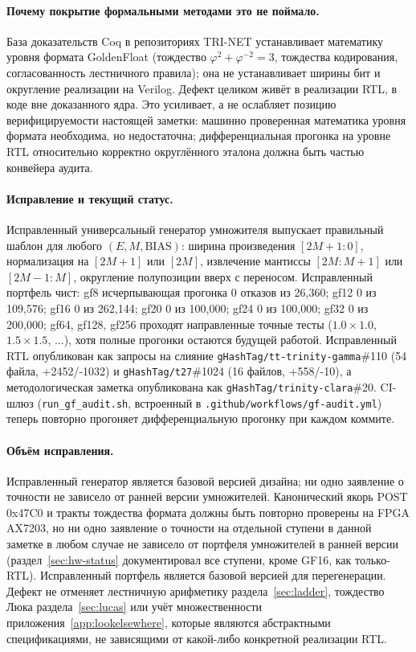 \documentclass[11pt,a4paper]{article}
\theoremstyle{plain}
\begin{document}
\paragraph{Почему покрытие формальными методами это не поймало.}
База доказательств Coq в репозиториях TRI-NET устанавливает математику
уровня формата GoldenFloat (тождество
\(\varphi^{2}+\varphi^{-2}=3\), тождества кодирования, согласованность
лестничного правила); она не устанавливает ширины бит и округление реализации на
Verilog. Дефект целиком живёт в реализации RTL, в коде вне доказанного ядра. Это
усиливает, а не ослабляет позицию верифицируемости настоящей заметки: машинно
проверенная математика уровня формата необходима, но недостаточна; дифференциальная
прогонка на уровне RTL относительно корректно округлённого эталона должна быть
частью конвейера аудита.

\paragraph{Исправление и текущий статус.}
Исправленный универсальный генератор умножителя выпускает правильный шаблон для
любого \((E, M, \mathrm{BIAS})\): ширина произведения \([2M+1:0]\),
нормализация на \([2M+1]\) или \([2M]\), извлечение мантиссы \([2M:M+1]\) или
\([2M-1:M]\), округление полупозиции вверх с переносом. Исправленный портфель
чист: gf8 исчерпывающая прогонка 0 отказов из 26{,}360; gf12 0 из 109{,}576;
gf16 0 из 262{,}144; gf20 0 из 100{,}000;
gf24 0 из 100{,}000; gf32 0 из 200{,}000; gf64, gf128, gf256 проходят
направленные точные тесты (\(1.0 \times 1.0\), \(1.5 \times 1.5\), \(\dots\)),
хотя полные прогонки остаются будущей работой. Исправленный RTL опубликован как
запросы на слияние \texttt{gHashTag/tt-trinity-gamma}\#110 (54 файла, +2452/-1032)
и \texttt{gHashTag/t27}\#1024 (16 файлов, +558/-10), а методологическая заметка
опубликована как \texttt{gHashTag/trinity-clara}\#20. CI-шлюз
(\texttt{run\_gf\_audit.sh}, встроенный в
\texttt{.github/workflows/gf-audit.yml}) теперь повторно прогоняет
дифференциальную прогонку при каждом коммите.

\paragraph{Объём исправления.}
Исправленный генератор является базовой версией дизайна; ни одно
заявление о точности не зависело от ранней версии умножителей.
Канонический якорь POST 0x47C0 и тракты тождества формата должны быть повторно
проверены на FPGA AX7203, но ни одно заявление о точности на отдельной
ступени в данной заметке в любом случае не зависело от портфеля умножителей в
ранней версии (раздел~\ref{sec:hw-status} документировал все ступени, кроме
GF16, как только-RTL). Исправленный портфель является базовой версией для
перегенерации. Дефект не отменяет лестничную арифметику
раздела~\ref{sec:ladder}, тождество Люка раздела~\ref{sec:lucas} или учёт
множественности приложения~\ref{app:lookelsewhere}, которые являются абстрактными
спецификациями, не зависящими от какой-либо конкретной реализации RTL.
\end{document}
